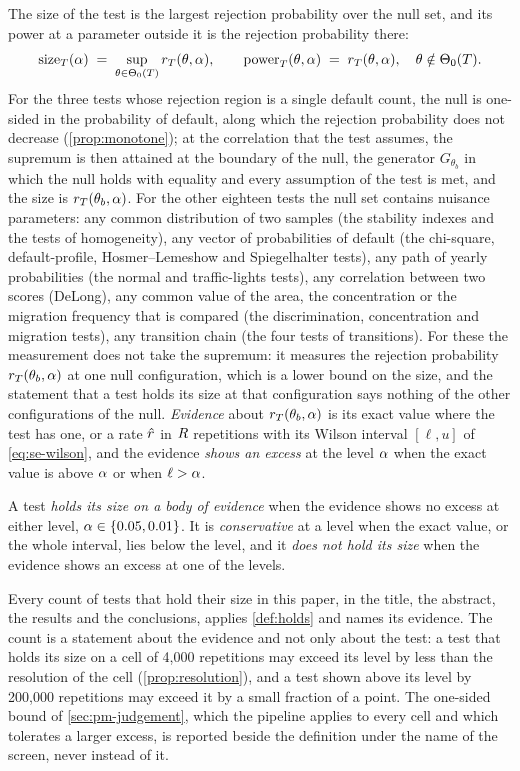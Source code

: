 The size of the test is the largest rejection probability over the null set, and its power at a parameter outside it is the rejection probability there:
\begin{equation}
\mathrm{size}_T(\alpha)\;=\;\sup_{\theta\in\Theta_0(T)}r_T(\theta,\alpha),\qquad
\mathrm{power}_T(\theta,\alpha)\;=\;r_T(\theta,\alpha),\quad \theta\notin\Theta_0(T).
\label{eq:size-power}
\end{equation}
For the three tests whose rejection region is a single default count, the null is one-sided in the probability of default, along which the rejection probability does not decrease (\cref{prop:monotone}); at the correlation that the test assumes, the supremum is then attained at the boundary of the null, the generator $G_{\theta_b}$ in which the null holds with equality and every assumption of the test is met, and the size is $r_T(\theta_b,\alpha)$.
For the other eighteen tests the null set contains nuisance parameters: any common distribution of two samples (the stability indexes and the tests of homogeneity), any vector of probabilities of default (the chi-square, default-profile, Hosmer--Lemeshow and Spiegelhalter tests), any path of yearly probabilities (the normal and traffic-lights tests), any correlation between two scores (DeLong), any common value of the area, the concentration or the migration frequency that is compared (the discrimination, concentration and migration tests), any transition chain (the four tests of transitions).
For these the measurement does not take the supremum: it measures the rejection probability $r_T(\theta_b,\alpha)$ at one null configuration, which is a lower bound on the size, and the statement that a test holds its size at that configuration says nothing of the other configurations of the null.
\emph{Evidence} about $r_T(\theta_b,\alpha)$ is its exact value where the test has one, or a rate $\hat{r}$ in $R$ repetitions with its Wilson interval $[\ell,u]$ of \eqref{eq:se-wilson}, and the evidence \emph{shows an excess} at the level $\alpha$ when the exact value is above $\alpha$ or when $\ell>\alpha$.
\begin{definition}
\label{def:holds}
A test \emph{holds its size on a body of evidence} when the evidence shows no excess at either level, $\alpha\in\{0.05,0.01\}$. It is \emph{conservative} at a level when the exact value, or the whole interval, lies below the level, and it \emph{does not hold its size} when the evidence shows an excess at one of the levels.
\end{definition}
Every count of tests that hold their size in this paper, in the title, the abstract, the results and the conclusions, applies \cref{def:holds} and names its evidence. The count is a statement about the evidence and not only about the test: a test that holds its size on a cell of 4,000 repetitions may exceed its level by less than the resolution of the cell (\cref{prop:resolution}), and a test shown above its level by 200,000 repetitions may exceed it by a small fraction of a point. The one-sided bound of \cref{sec:pm-judgement}, which the pipeline applies to every cell and which tolerates a larger excess, is reported beside the definition under the name of the screen, never instead of it.

